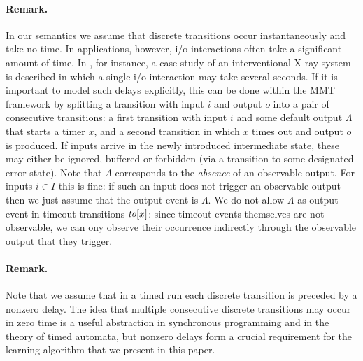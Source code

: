 \paragraph{Remark.}
In our semantics we assume that discrete transitions occur instantaneously and take no time. In applications, however, i/o interactions
often take a significant amount of time. In \cite{SHV16}, for instance, a case study of an interventional X-ray system is
described in which a single i/o interaction may take several seconds. If it is important to model such delays
explicitly, this can be done within the MMT framework by splitting a transition with input $i$ and output $o$ into
a pair of consecutive transitions: a first transition with input $i$ and some default output $\Lambda$ that starts
a timer $x$, and a second transition in which $x$ times out and output $o$ is produced.
If inputs arrive in the newly introduced intermediate state, these may either be ignored, buffered or forbidden
(via a transition to some designated error state).
Note that $\Lambda$ corresponds to the \emph{absence} of an observable output. For inputs $i \in I$ this is fine: if such
an input does not trigger an observable output then we just assume that the output event is $\Lambda$. We do not allow
$\Lambda$ as output event in timeout transitions $\mathit{to}[x]$: since timeout events themselves are not observable, we can ony observe their occurrence indirectly through the observable output that they trigger.

\iflong
\paragraph{Remark.}
Note that we assume that in a timed run each discrete transition is preceded by a nonzero delay.
The idea that multiple consecutive discrete transitions may occur in zero time is a useful abstraction in synchronous
programming and in the theory of timed automata, but nonzero delays form
a crucial requirement for the learning algorithm that we present in this paper.


